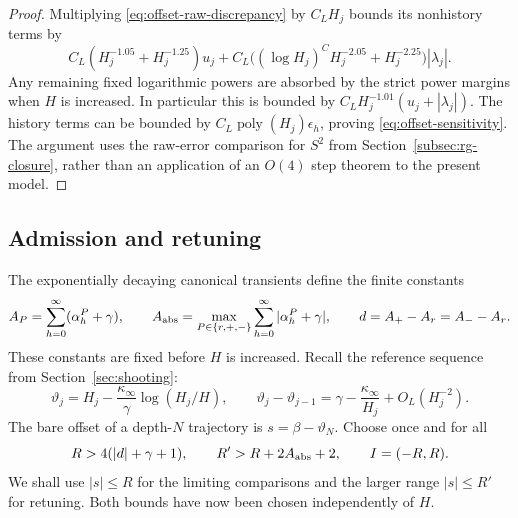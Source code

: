 \begin{proof}
Multiplying \eqref{eq:offset-raw-discrepancy} by $C_LH_j$ bounds its
nonhistory terms by
\[
 C_L(H_j^{-1.05}+H_j^{-1.25})u_j
 +C_L\bigl((\log H_j)^C H_j^{-2.05}
                         +H_j^{-2.25}\bigr)|\lambda_j|.
\]
Any remaining fixed logarithmic powers are absorbed by the strict
power margins when $H$ is increased.  In particular this is bounded
by $C_LH_j^{-1.01}(u_j+|\lambda_j|)$.  The history terms can be
bounded by $C_L\operatorname{poly}(H_j)\epsilon_h$, proving
\eqref{eq:offset-sensitivity}.  The argument uses the raw-error
comparison for $S^2$ from Section~\ref{subsec:rg-closure}, rather
than an application of an $O(4)$ step theorem to the present model.
\end{proof}

\subsection{Admission and retuning}

The exponentially decaying canonical transients define the finite
constants
\begin{equation}
 A_P=\sum_{h=0}^{\infty}(\alpha_h^P+\gamma),\qquad
 A_{\rm abs}=\max_{P\in\{r,+,-\}}
                  \sum_{h=0}^{\infty}|\alpha_h^P+\gamma|,
 \qquad d=A_+-A_r=A_--A_r.
 \label{eq:offset-transients}
\end{equation}
These constants are fixed before $H$ is increased.  Recall the
reference sequence from Section~\ref{sec:shooting}:
\begin{equation}
 \vartheta_j=H_j-\frac{\kappa_\infty}{\gamma}\log(H_j/H),
 \qquad
 \vartheta_j-\vartheta_{j-1}
       =\gamma-\frac{\kappa_\infty}{H_j}+O_L(H_j^{-2}).
 \label{eq:offset-profile}
\end{equation}
The bare offset of a depth-$N$ trajectory is
$s=\beta-\vartheta_N$.  Choose once and for all
\begin{equation}
 R>4(|d|+\gamma+1),\qquad
 R'>R+2A_{\rm abs}+2,\qquad I=(-R,R).
 \label{eq:offset-range}
\end{equation}
We shall use $|s|\le R$ for the limiting comparisons and the larger
range $|s|\le R'$ for retuning.  Both bounds have now been chosen
independently of $H$.

